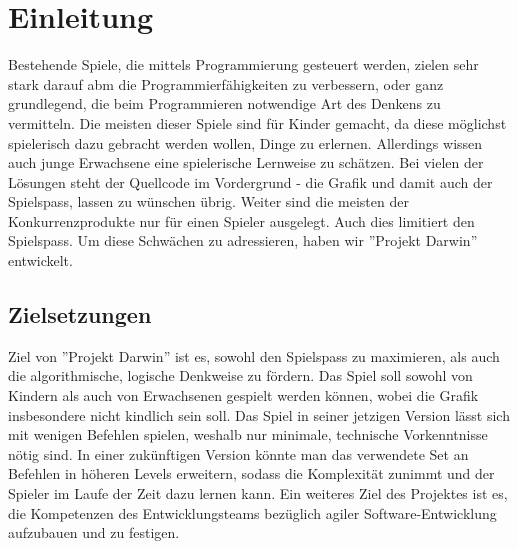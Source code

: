 \documentclass[11pt,a4paper,titlepage]{article}
\begin{document}

\newpage

\pagestyle{myheadings}

\section{Einleitung}


Bestehende Spiele, die mittels Programmierung gesteuert werden, zielen sehr stark darauf abm die Programmierfähigkeiten zu verbessern, oder ganz grundlegend, die beim Programmieren notwendige Art des Denkens zu vermitteln.
Die meisten dieser Spiele sind für Kinder gemacht, da diese möglichst spielerisch dazu gebracht werden wollen, Dinge zu erlernen. Allerdings wissen auch junge Erwachsene eine spielerische Lernweise zu schätzen.
Bei vielen der Lösungen steht der Quellcode im Vordergrund - die Grafik und damit auch der Spielspass, lassen zu wünschen übrig.
Weiter sind die meisten der Konkurrenzprodukte nur für einen Spieler ausgelegt. Auch dies limitiert den Spielspass.
Um diese Schwächen zu adressieren, haben wir ''Projekt Darwin'' entwickelt.

\subsection{Zielsetzungen}



Ziel von ''Projekt Darwin'' ist es, sowohl den Spielspass zu maximieren, als auch die algorithmische, logische Denkweise zu fördern. Das Spiel soll sowohl von Kindern als auch von Erwachsenen gespielt werden können, wobei die Grafik insbesondere nicht kindlich sein soll.
Das Spiel in seiner jetzigen Version lässt sich mit wenigen Befehlen spielen, weshalb nur minimale, technische Vorkenntnisse nötig sind.
In einer zukünftigen Version könnte man das verwendete Set an Befehlen in höheren Levels erweitern, sodass die Komplexität zunimmt und der Spieler im Laufe der Zeit dazu lernen kann.
Ein weiteres Ziel des Projektes ist es, die Kompetenzen des Entwicklungsteams bezüglich agiler Software-Entwicklung aufzubauen und zu festigen.
\end{document}
